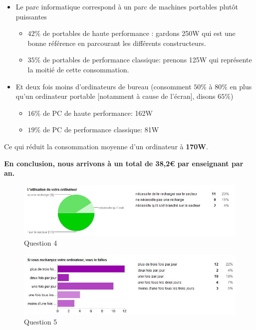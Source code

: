 \documentclass[a4paper,11pt,french]{report}
\begin{document}
\begin{itemize}
\item Le parc informatique correspond à un parc de machines portables plutôt puissantes
  \begin{itemize}
  \item $42\%$ de portables de haute performance : gardons 250W qui est une bonne référence en parcourant les différents constructeurs.
  \item $35\%$ de portables de performance classique: prenons 125W qui représente la moitié de cette consommation.  
  \end{itemize} 
\item Et deux fois moins d'ordinateurs de bureau (consomment $50\%$ à $80\%$ en plus qu'un ordinateur portable [notamment à cause de l'écran], disons $65\%$)
  \begin{itemize}
  \item $16\%$ de PC de haute performance: 162W
  \item $19\%$ de PC de performance classique: 81W
  \end{itemize} 
\end{itemize}

Ce qui réduit la consommation moyenne d'un ordinateur à \textbf{170W}.\\
\begin{center}
\textbf{En conclusion, nous arrivons à un total de 38,2\euro{} par enseignant par an.}
\end{center}

\begin{figure}[h!]
\includegraphics[width=\textwidth]{i9.JPG}
\caption{Question 4}
\label{i9}
\end{figure}

\begin{figure}[h!]
\includegraphics[width=\textwidth]{i10.JPG}
\caption{Question 5}
\label{i10}
\end{figure}
\end{document}
